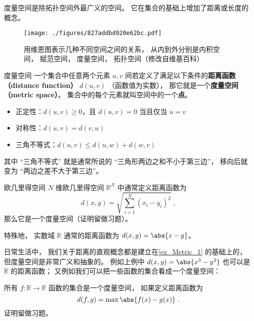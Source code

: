 

度量空间是除拓扑空间外最广义的空间。 它在集合的基础上增加了距离或长度的概念。
\begin{figure}[ht]
\centering
\texttt{[image: ./figures/827addbd920e62bc.pdf]}
\caption{用维恩图表示几种不同空间之间的关系， 从内到外分别是内积空间， 赋范空间， 度量空间， 拓扑空间（修改自维基百科）} \label{fig_Metric_2}
\end{figure}

\begin{definition}{度量空间}\label{def_Metric_2}
一个集合中任意两个元素 $u, v$ 间若定义了满足以下条件的\textbf{距离函数（distance function）} $d(u, v)$ （函数值为实数）， 那它就是一个\textbf{度量空间（metric space）}。 集合中的每个元素就叫空间中的一个\textbf{点}。
\begin{itemize}
\item 正定性：$d(u, v) \geq 0$，且 $d(u, v)=0$ 当且仅当 $u=v$
\item 对称性：$d(u, v) = d(v, u)$
\item 三角不等式：$d(u, v) \leqslant d(u, w) + d(w, v)$
\end{itemize}
\end{definition}
其中 “三角不等式” 就是通常所说的 “三角形两边之和不小于第三边”， 移向后就变为 “两边之差不大于第三边”。

\begin{example}{欧几里得空间}\label{ex_Metric_1}
$N$ 维欧几里得空间 $\mathbb R^N$ 中通常定义距离函数为
\begin{equation}\label{eq_Metric_1}
d(x, y) = \sqrt{\sum_{i=1}^N (x_i - y_i)^2}~,
\end{equation}
那么它是一个度量空间（证明留做习题）。

特殊地， 实数域 $\mathbb R$ 通常的距离函数为 $d(x, y) = \abs{x - y}$。
\end{example}

日常生活中， 我们关于距离的直观概念都是建立在\autoref{ex_Metric_1} 的基础上的， 但度量空间是非常广义和抽象的。 例如上例中 $d(x, y) = \abs{x^3 - y^3}$ 也可以是 $\mathbb R$ 的距离函数； 又例如我们可以把一些函数的集合看成一个度量空间：
\begin{example}{}\label{ex_Metric_2}
所有 $f:\mathbb R \to \mathbb R$ 函数的集合是一个度量空间， 如果定义距离函数为
\begin{equation}
d(f, g) = \max{\abs{f(x) - g(x)}}~.
\end{equation}
证明留做习题。
\end{example}

